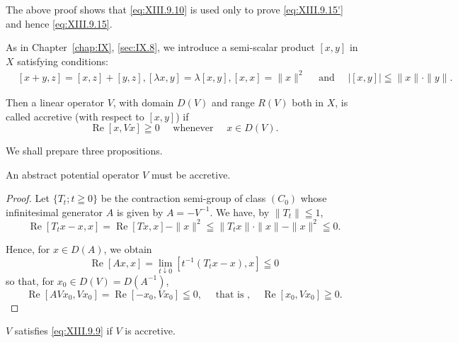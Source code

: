 \begin{remarku} The above proof shows that \eqref{eq:XIII.9.10} is used only to prove \eqref{eq:XIII.9.15'} and hence \eqref{eq:XIII.9.15}. 
\end{remarku}

As in Chapter~\ref{chap:IX}, \ref{sec:IX.8}, we introduce a semi-scalar product $[x, y]$ in $X$ satisfying conditions: 
\begin{equation}\label{eq:XIII.9.23}
\begin{aligned}
&{[ x + y, z ] = [ x, z ] + [ y, z ], [ \lambda x, y ] = \lambda [ x, y ],} {[ x, x ] = \| x \| ^{2} \quad \text{ and } \quad | [ x, y ] | \leqq \| x \| \cdot \| y \|.}
\end{aligned}
\end{equation}

Then a linear operator $V$, with domain $D(V)$ and range $R(V)$ both in $X$, is called accretive (with respect to $[x, y]$) if 
\begin{equation}\label{eq:XIII.9.24}
\operatorname{Re} [ x, V x ] \geqq 0 \quad \text{ whenever } \quad x \in D (V) .
\end{equation}

We shall prepare three propositions. 

\begin{proposition}\label{prop:XIII.9.Proposition.2} An abstract potential operator $V$ must be accretive. 
\end{proposition}

\begin{proof}
 Let $\{T_t; t \geqq 0\}$ be the contraction semi-group of class $(C_0)$ whose infinitesimal generator $A$ is given by $A = -V^{-1}$. We have, by $\| T_t \| \leqq 1$, 
\[
\operatorname{Re} \left[ T _{t} x - x, x \right] = \operatorname{Re} [ T x, x ] - \| x \| ^{2} \leqq \| T _{t} x \| \cdot \| x \| - \| x \| ^{2} \leqq 0. \]

Hence, for $x \in D(A)$, we obtain 
\[
\operatorname{Re} [ A x, x ] = \lim\limits _{t \downarrow 0} [ t ^{-1} (T _{t} x - x), x ] \leqq 0
\]
so that, for $x_0 \in D(V) = D(A^{-1})$, 
\[
\operatorname{Re} \left[ A V x _{0}, V x _{0} \right] = \operatorname{Re} \left[ - x _{0}, V x _{0} \right] \leqq 0, \quad \text{ that is }, \quad \operatorname{Re} \left[ x _{0}, V x _{0} \right] \geqq 0.
\]
\end{proof}

\begin{proposition}\label{prop:XIII.9.Proposition.3} $V$ satisfies \eqref{eq:XIII.9.9} if $V$ is accretive. 
\end{proposition}

